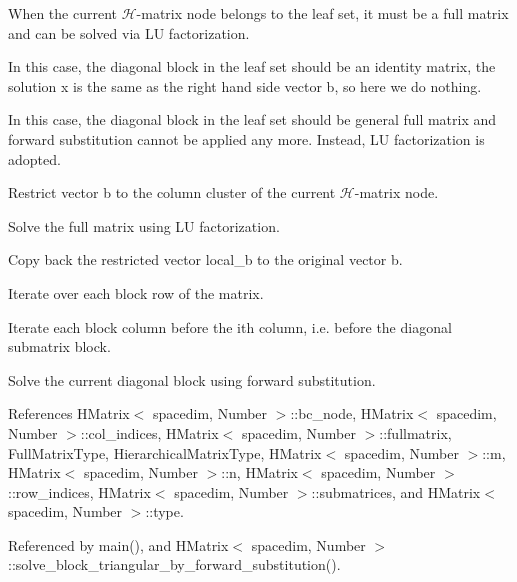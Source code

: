 When the current $\mathcal{H}$-\/matrix node belongs to the leaf set, it must be a full matrix and can be solved via LU factorization.

In this case, the diagonal block in the leaf set should be an identity matrix, the solution {\ttfamily x} is the same as the right hand side vector {\ttfamily b}, so here we do nothing.

In this case, the diagonal block in the leaf set should be general full matrix and forward substitution cannot be applied any more. Instead, LU factorization is adopted.

Restrict vector {\ttfamily b} to the column cluster of the current $\mathcal{H}$-\/matrix node.

Solve the full matrix using LU factorization.

Copy back the restricted vector {\ttfamily local\+\_\+b} to the original vector {\ttfamily b}.

Iterate over each block row of the matrix.

Iterate each block column before the i\textquotesingle{}th column, i.\+e. before the diagonal submatrix block.

Solve the current diagonal block using forward substitution.

References H\+Matrix$<$ spacedim, Number $>$\+::bc\+\_\+node, H\+Matrix$<$ spacedim, Number $>$\+::col\+\_\+indices, H\+Matrix$<$ spacedim, Number $>$\+::fullmatrix, Full\+Matrix\+Type, Hierarchical\+Matrix\+Type, H\+Matrix$<$ spacedim, Number $>$\+::m, H\+Matrix$<$ spacedim, Number $>$\+::n, H\+Matrix$<$ spacedim, Number $>$\+::row\+\_\+indices, H\+Matrix$<$ spacedim, Number $>$\+::submatrices, and H\+Matrix$<$ spacedim, Number $>$\+::type.



Referenced by main(), and H\+Matrix$<$ spacedim, Number $>$\+::solve\+\_\+block\+\_\+triangular\+\_\+by\+\_\+forward\+\_\+substitution().

\mbox{\label{classHMatrix_aa8046a87be454c81d4a884b53150685a}} 
